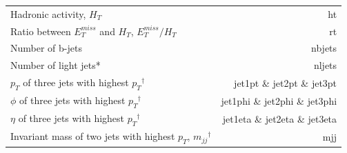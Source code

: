 \documentclass[12pt, a4paper]{book}
\begin{document}
\begin{table}[!h]
\begin{tabular}{l|r}
        Hadronic activity, $H_T$                                                        & ht\\
        Ratio between $E_T^{miss}$ and $H_T$, $E_T^{miss}/H_T$                          & rt\\
        Number of b-jets                                                                & nbjets         \\
        Number of light jets*                                                           & nljets         \\
        $p_T$ of three jets with highest $p_T$$^\dagger$                                & jet1pt \& jet2pt \& jet3pt\\
        $\phi$ of three jets with highest $p_T$$^\dagger$                               & jet1phi \& jet2phi \& jet3phi\\
        $\eta$ of three jets with highest $p_T$$^\dagger$                               & jet1eta \& jet2eta \& jet3eta\\
        Invariant mass of two jets with highest $p_T$, $m_{jj}$$^\dagger$               & mjj\\\midrule\midrule
    \end{tabular}
    \label{tab:variables}
\end{table}
\end{document}
